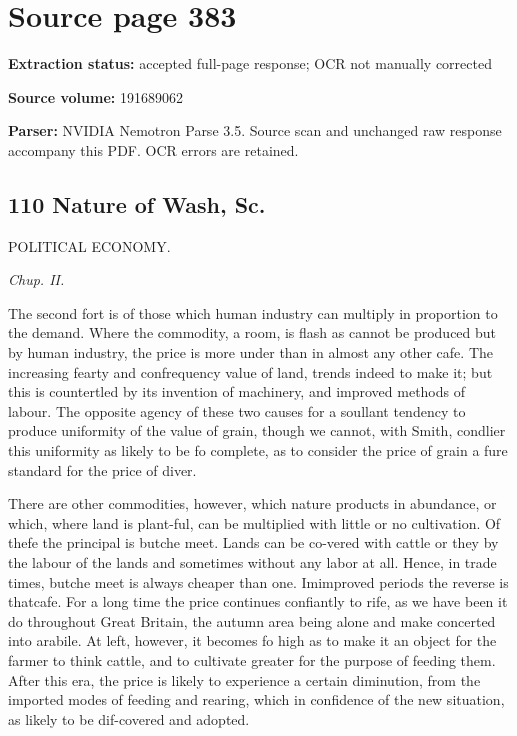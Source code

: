 \clearpage
\section{Source page 383}
\textbf{Extraction status:} accepted full-page response; OCR not manually corrected\par
\textbf{Source volume:} 191689062\par
\textbf{Parser:} NVIDIA Nemotron Parse 3.5. Source scan and unchanged raw response accompany this PDF. OCR errors are retained.\par\medskip
\subsection*{110 Nature of Wash, Sc.}
POLITICAL ECONOMY.\par\medskip
{\small\itshape Chup. II.\par}\medskip
The second fort is of those which human industry can multiply in proportion to the demand. Where the commodity, a room, is flash as cannot be produced but by human industry, the price is more under than in almost any other cafe. The increasing fearty and confrequency value of land, trends indeed to make it; but this is countertled by its invention of machinery, and improved methods of labour. The opposite agency of these two causes for a soullant tendency to produce uniformity of the value of grain, though we cannot, with Smith, condlier this uniformity as likely to be fo complete, as to consider the price of grain a fure standard for the price of diver.\par\medskip
There are other commodities, however, which nature products in abundance, or which, where land is plant-ful, can be multiplied with little or no cultivation. Of thefe the principal is butche meet. Lands can be co-vered with cattle or they by the labour of the lands and sometimes without any labor at all. Hence, in trade times, butche meet is always cheaper than one. Imimproved periods the reverse is thatcafe. For a long time the price continues confiantly to rife, as we have been it do throughout Great Britain, the autumn area being alone and make concerted into arabile. At left, however, it becomes fo high as to make it an object for the farmer to think cattle, and to cultivate greater for the purpose of feeding them. After this era, the price is likely to experience a certain diminution, from the imported modes of feeding and rearing, which in confidence of the new situation, as likely to be dif-covered and adopted.\par\medskip
